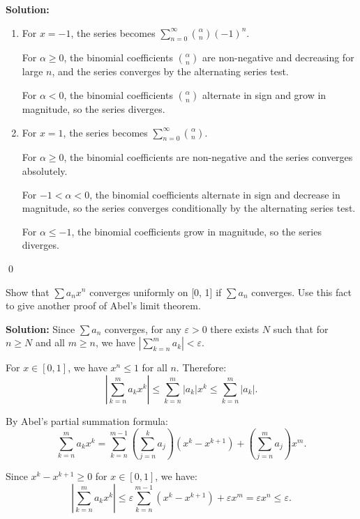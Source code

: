 \noindent\textbf{Solution:}
\begin{enumerate}[label=(\alph*)]
\item For \( x = -1 \), the series becomes \( \sum_{n=0}^\infty \binom{\alpha}{n} (-1)^n \).

For \( \alpha \geq 0 \), the binomial coefficients \( \binom{\alpha}{n} \) are non-negative and decreasing for large \( n \), and the series converges by the alternating series test.

For \( \alpha < 0 \), the binomial coefficients \( \binom{\alpha}{n} \) alternate in sign and grow in magnitude, so the series diverges.

\item For \( x = 1 \), the series becomes \( \sum_{n=0}^\infty \binom{\alpha}{n} \).

For \( \alpha \geq 0 \), the binomial coefficients are non-negative and the series converges absolutely.

For \( -1 < \alpha < 0 \), the binomial coefficients alternate in sign and decrease in magnitude, so the series converges conditionally by the alternating series test.

For \( \alpha \leq -1 \), the binomial coefficients grow in magnitude, so the series diverges.
\end{enumerate}\qed


\begin{problembox}
Show that \( \sum a_n x^n \) converges uniformly on [0, 1] if \( \sum a_n \) converges. Use this fact to give another proof of Abel's limit theorem.
\end{problembox}

\noindent\textbf{Solution:} Since \( \sum a_n \) converges, for any \( \varepsilon > 0 \) there exists \( N \) such that for \( n \geq N \) and all \( m \geq n \), we have \( |\sum_{k=n}^m a_k| < \varepsilon \).

For \( x \in [0, 1] \), we have \( x^n \leq 1 \) for all \( n \). Therefore:
\[\left|\sum_{k=n}^m a_k x^k\right| \leq \sum_{k=n}^m |a_k| x^k \leq \sum_{k=n}^m |a_k|.\]

By Abel's partial summation formula:
\[\sum_{k=n}^m a_k x^k = \sum_{k=n}^{m-1} \left(\sum_{j=n}^k a_j\right)(x^k - x^{k+1}) + \left(\sum_{j=n}^m a_j\right)x^m.\]

Since \( x^k - x^{k+1} \geq 0 \) for \( x \in [0, 1] \), we have:
\[\left|\sum_{k=n}^m a_k x^k\right| \leq \varepsilon \sum_{k=n}^{m-1} (x^k - x^{k+1}) + \varepsilon x^m = \varepsilon x^n \leq \varepsilon.\]

